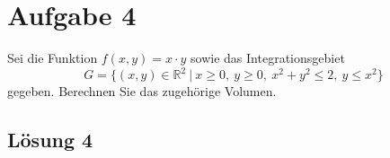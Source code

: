 \documentclass[main.tex]{subfiles}
\begin{document}
\section{Aufgabe 4}
Sei die Funktion 
$f(x,y) = x \cdot y$ 
sowie das Integrationsgebiet
\[
G = \{ (x,y) \in \mathbb{R}^2 \ 
| \ x \geq 0, \ y \geq 0, \ x^2 + y^2 \leq 2, \ y \leq x^2 \} 
\]
gegeben. Berechnen Sie das zugehörige Volumen.

\subsection{Lösung 4}
\end{document}
